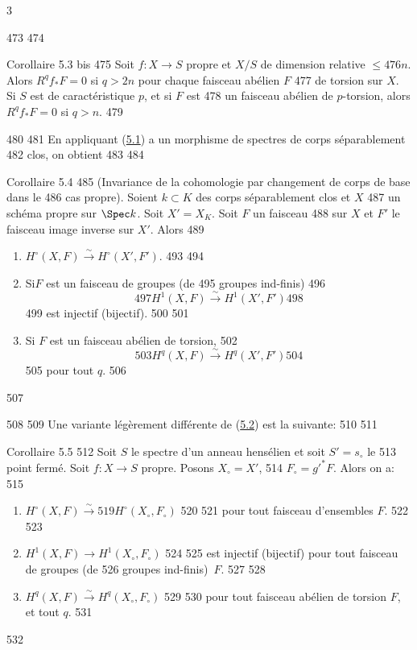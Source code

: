 3	\documentclass[10pt]{../fichiers-configuration-latex/smfart}
\begin{document}
   473	
   474	\begin{enonce*}{Corollaire 5.3 bis}
   475	Soit $f:X\rightarrow S$ propre et $X/S$ de dimension relative $\leq
   476	n$. Alors $R^qf_{\ast}F=0$ si $q>2n$ pour chaque faisceau abélien $F$
   477	de torsion sur $X$. Si $S$ est de caractéristique $p$, et si $F$ est
   478	un faisceau abélien de $p$-torsion, alors $R^qf_{\ast}F=0$ si $q>n$.
   479	\end{enonce*}
   480	
   481	En appliquant (\hyperref[XII.thm5.1]{5.1}) a un morphisme de spectres de corps séparablement
   482	clos, on obtient
   483	
   484	\begin{enonce*}{Corollaire 5.4}
   485	(Invariance de la cohomologie par changement de corps de base dans le
   486	  cas propre). Soient $k\subset K$ des corps séparablement clos et $X$
   487	  un schéma propre sur $\Spec k$. Soit $X'=X_K$. Soit $F$ un faisceau
   488	  sur $X$ et $F'$ le faisceau image inverse sur $X'$. Alors
   489	\begin{enumerate}
   490	\renewcommand{\theenumi}{\roman{enumi}}
   491	\renewcommand{\labelenumi}{(\theenumi)}
   492	\item $H^{\circ}(X,F)\xrightarrow{\sim} H^{\circ}(X',F')$.
   493	
   494	\item Si\pageoriginale $F$ est un faisceau de groupes (\resp de
   495	  groupes ind-finis)
   496	$$
   497	H^1(X,F)\xrightarrow{\sim} H^1(X',F')
   498	$$
   499	est injectif (\resp bijectif).
   500	
   501	\item Si $F$ est un faisceau abélien de torsion,
   502	$$
   503	H^q(X,F)\xrightarrow{\sim} H^q(X',F')
   504	$$
   505	pour tout $q$.
   506	\end{enumerate}
   507	\end{enonce*}
   508	
   509	Une variante légèrement différente de (\hyperref[XII.cor5.2]{5.2}) est la suivante:
   510	
   511	\begin{enonce*}{Corollaire 5.5}
   512	Soit $S$ le spectre d'un anneau hensélien et soit $S'=s_{\circ}$ le
   513	point fermé. Soit $f:X\rightarrow S$ propre. Posons $X_{\circ}=X'$,
   514	$F_{\circ}={g'}^{\ast}F$. Alors on a:
   515	\begin{enumerate}
   516	\renewcommand{\theenumi}{\roman{enumi}}
   517	\renewcommand{\labelenumi}{(\theenumi)}
   518	\item $H^{\circ}(X,F)\xrightarrow{\sim}
   519	  H^{\circ}(X_{\circ},F_{\circ})$
   520	
   521	pour tout faisceau d'ensembles $F$.
   522	
   523	\item $H^1(X,F)\rightarrow H^1(X_{\circ},F_{\circ})$
   524	
   525	est injectif (\resp bijectif) pour tout faisceau de groupes (\resp de
   526	groupes ind-finis)~$F$.
   527	
   528	\item $H^q(X,F)\xrightarrow{\sim} H^q(X_{\circ},F_{\circ})$
   529	
   530	pour tout faisceau abélien de torsion $F$, et tout $q$.
   531	\end{enumerate}
   532	\end{enonce*}
\end{document}
